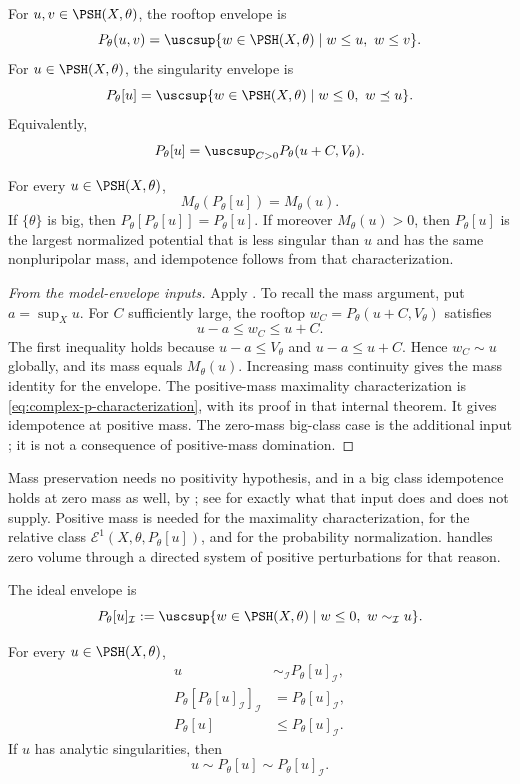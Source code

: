 For \(u,v\in\PSH(X,\theta)\), the rooftop envelope is
\[
 P_\theta(u,v)
 =\uscsup\{w\in\PSH(X,\theta)\mid w\leq u,\ w\leq v\}.
\]
For \(u\in\PSH(X,\theta)\), the singularity envelope is
\[
 P_\theta[u]
 =\uscsup\{w\in\PSH(X,\theta)\mid
             w\leq0,\ w\preceq u\}.
\]
Equivalently,
\[
 P_\theta[u]
 =\uscsup_{C>0}P_\theta(u+C,V_\theta).
\]

\begin{theorem}\label{thm:appH-p-projection}
For every \(u\in\PSH(X,\theta)\),
\[
 M_\theta(P_\theta[u])=M_\theta(u).
\]
If \(\{\theta\}\) is big, then \(P_\theta[P_\theta[u]]=P_\theta[u]\).
If moreover \(M_\theta(u)>0\), then \(P_\theta[u]\) is the largest
normalized potential that is less singular than \(u\) and has the same
nonpluripolar mass, and idempotence follows from that characterization.
\end{theorem}

\begin{proof}[From the model-envelope inputs]
Apply .  To recall the mass argument, put
\(a=\sup_Xu\).  For \(C\) sufficiently large, the rooftop
\(w_C=P_\theta(u+C,V_\theta)\) satisfies
\[
                   u-a\leq w_C\leq u+C.
\]
The first inequality holds because \(u-a\leq V_\theta\) and
\(u-a\leq u+C\).  Hence \(w_C\sim u\) globally, and its mass equals
\(M_\theta(u)\).  Increasing mass continuity gives the mass identity
for the envelope.  The positive-mass maximality characterization is
\eqref{eq:complex-p-characterization}, with its proof in that internal
theorem.  It gives idempotence at positive mass.  The zero-mass big-class
case is the additional input \cite[Theorem~1.2]{PSWZ26}; it is not a
consequence of positive-mass domination.
\end{proof}

Mass preservation needs no positivity hypothesis, and in a big class
idempotence holds at zero mass as well, by \cite[Theorem~1.2]{PSWZ26}; see
 for exactly what that input does and does
not supply.  Positive mass is needed for the maximality characterization,
for the relative class \(\mathcal E^1(X,\theta,P_\theta[u])\), and for the
probability normalization.   handles zero
volume through a directed system of positive perturbations for that
reason.

The ideal envelope is
\[
 P_\theta[u]_{\mathcal I}
 :=\uscsup\{w\in\PSH(X,\theta)\mid
           w\leq0,\ w\sim_{\mathcal I}u\}.
\]

\begin{theorem}\label{thm:appH-i-projection}
For every \(u\in\PSH(X,\theta)\),
\[
\begin{aligned}
 u&\sim_{\mathcal I}P_\theta[u]_{\mathcal I},\\
 P_\theta[P_\theta[u]_{\mathcal I}]_{\mathcal I}
   &=P_\theta[u]_{\mathcal I},\\
 P_\theta[u]&\leq P_\theta[u]_{\mathcal I}.
\end{aligned}
\]
If \(u\) has analytic singularities, then
\[
                         u\sim P_\theta[u]
                         \sim P_\theta[u]_{\mathcal I}.
\]
\end{theorem}

